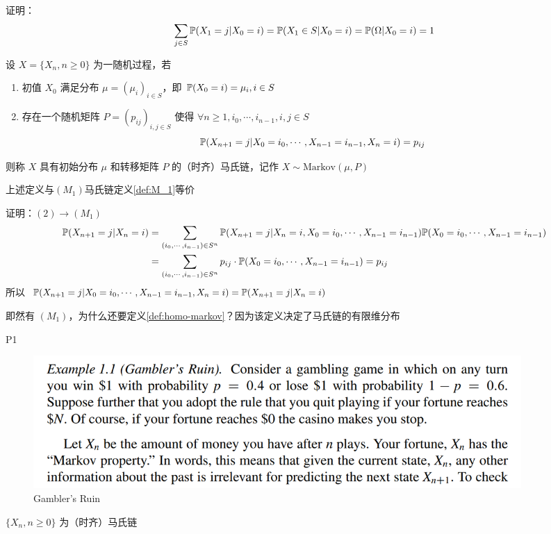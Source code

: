证明：
\[
\sum_{j\in S}\mathbb{P}(X_1=j|X_0=i)=\mathbb{P}(X_1\in S|X_0=i)=\mathbb{P}(\Omega|X_0=i)=1
\]

\begin{definition}[时齐马氏链]\label{def:homo-markov}
    设 $X=\{X_n,n\geq 0\}$ 为一随机过程，若
    \begin{enumerate}
        \item 初值 $X_0$ 满足分布 $\mu=(\mu_i)_{i\in S}$，即 $\mathbb{P}(X_0=i)=\mu_i,i\in S$
        \item 存在一个随机矩阵 $P=(p_{ij})_{i,j\in S}$ 使得 $\forall n\geq 1,i_0,\cdots,i_{n-1},i,j\in S$
        \[
        \mathbb{P}(X_{n+1}=j|X_0=i_0,\cdots,X_{n-1}=i_{n-1},X_n=i)=p_{ij}
        \]
    \end{enumerate}
    则称 $X$ 具有初始分布 $\mu$ 和转移矩阵 $P$ 的（时齐）马氏链，记作 $X\sim \text{Markov}(\mu,P)$
\end{definition}

上述定义与$(M_1)$马氏链定义\ref{def:M_1}等价

证明：$(2)\rightarrow (M_1)$
\[
\begin{aligned}
    \mathbb{P}(X_{n+1}=j|X_n=i)&=\sum_{(i_0,\cdots,i_{n-1})\in S^n}\mathbb{P}(X_{n+1}=j|X_n=i,X_0=i_0,\cdots,X_{n-1}=i_{n-1})\mathbb{P}(X_0=i_0,\cdots,X_{n-1}=i_{n-1})\\
    &=\sum_{(i_0,\cdots,i_{n-1})\in S^n}p_{ij}\cdot \mathbb{P}(X_0=i_0,\cdots,X_{n-1}=i_{n-1})=p_{ij}
\end{aligned}
\]
所以 $\mathbb{P}(X_{n+1}=j|X_0=i_0,\cdots,X_{n-1}=i_{n-1},X_n=i)=\mathbb{P}(X_{n+1}=j|X_n=i)$

即然有 $(M_1)$，为什么还要定义\ref{def:homo-markov}？因为该定义决定了马氏链的有限维分布

\begin{example} P1 
    \begin{figure}[H]
        \centering
        \includegraphics[width=0.9\textwidth]{figures/Gambler's Ruin.png}
        \caption{Gambler's Ruin}
    \end{figure}
\end{example}

\begin{claim}
$\{X_n,n\geq 0\}$ 为（时齐）马氏链
\end{claim}

